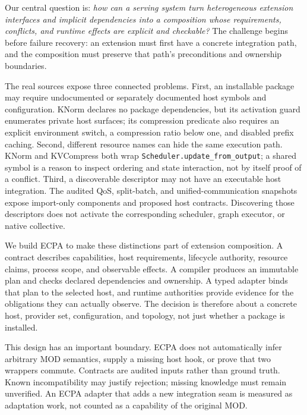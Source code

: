 \documentclass[letterpaper,twocolumn,10pt]{article}
\newcommand{\system}{\textsc{ECPA}\xspace}
\newcommand{\code}[1]{\texttt{#1}}
\begin{document}
Our central question is: \emph{how can a serving system turn heterogeneous
extension interfaces and implicit dependencies into a composition whose
requirements, conflicts, and runtime effects are explicit and checkable?}
The challenge begins before failure recovery: an extension must first have
a concrete integration path, and the composition must preserve that path's
preconditions and ownership boundaries.

The real sources expose three connected problems. First, an installable
package may require undocumented or separately documented host symbols and
configuration. KNorm declares no package dependencies, but its activation
guard enumerates private host surfaces; its compression predicate also
requires an explicit environment switch, a compression ratio below one, and
disabled prefix caching. Second, different resource names can hide the same
execution path. KNorm and KVCompress both wrap
\code{Scheduler.update\_from\_output}; a shared symbol is a reason to inspect
ordering and state interaction, not by itself proof of a conflict. Third,
a discoverable descriptor may not have an executable host integration.
The audited QoS, split-batch, and unified-communication snapshots expose
import-only components and proposed host contracts. Discovering those
descriptors does not activate the corresponding scheduler, graph executor,
or native collective.

We build \system to make these distinctions part of extension composition.
A contract describes capabilities, host requirements, lifecycle authority,
resource claims, process scope, and observable effects. A compiler produces
an immutable plan and checks declared dependencies and ownership. A typed
adapter binds that plan to the selected host, and runtime authorities provide
evidence for the obligations they can actually observe. The decision is
therefore about a concrete host, provider set, configuration, and topology,
not just whether a package is installed.

This design has an important boundary. ECPA does not automatically infer
arbitrary MOD semantics, supply a missing host hook, or prove that two
wrappers commute. Contracts are audited inputs rather than ground truth.
Known incompatibility may justify rejection; missing knowledge must remain
unverified. An ECPA adapter that adds a new integration seam is measured as
adaptation work, not counted as a capability of the original MOD.
\end{document}
